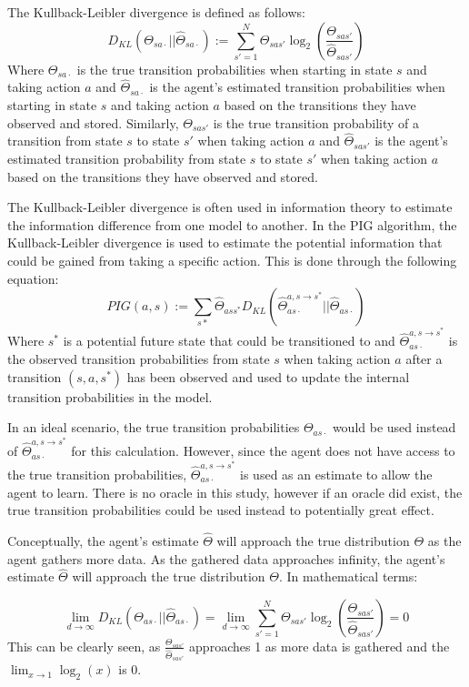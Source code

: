\documentclass[12pt]{thesis}
\begin{document}
The Kullback-Leibler divergence is defined as follows:
\[D_{KL} (\Theta_{sa\cdot} || \hat{\Theta}_{sa\cdot}) := \sum_{s' = 1}^{ N} \Theta_{sas'} \log_{2}(\frac{\Theta_{sas'}}{\hat{\Theta}_{sas'}})   \]
Where $\Theta_{sa\cdot}$ is the true transition probabilities when starting in state $s$ and taking action $a$ and $\hat{\Theta}_{sa\cdot}$ is the agent's estimated transition probabilities when starting in state $s$ and taking action $a$  based on the transitions they have observed and stored. Similarly, $\Theta_{sas'}$ is the true transition probability of a transition from state $s$ to state $s'$ when taking action $a$ and $\hat{\Theta}_{sas'}$ is the agent's estimated transition probability from state $s$ to state $s'$ when taking action $a$ based on the transitions they have observed and stored.

The Kullback-Leibler divergence is often used in information theory to estimate the information difference from one model to another. In the PIG algorithm, the Kullback-Leibler divergence is used to estimate the potential information that could be gained from taking a specific action.
This is done through the following equation:
\[ PIG(a,s) := \sum_{s*} \hat{\Theta}_{ass^{*}}D_{KL}(\hat{\Theta}_{as\cdot}^{a,s \rightarrow s^{*}} || \hat{\Theta}_{as\cdot}) \]
Where $s^{*}$ is a potential future state that could be transitioned to and $\hat{\Theta}_{as\cdot}^{a,s \rightarrow s^{*}}$ is the observed transition probabilities from state $s$ when taking action $a$ after a transition $(s,a,s^{*})$ has been observed and used to update the internal transition probabilities in the model.

In an ideal scenario, the true transition probabilities $\Theta_{as\cdot}$ would be used instead of $\hat{\Theta}_{as\cdot}^{a,s \rightarrow s^{*}}$ for this calculation. However, since the agent does not have access to the true transition probabilities, $\hat{\Theta}_{as\cdot}^{a,s \rightarrow s^{*}}$ is used as an estimate to allow the agent to learn. There is no oracle in this study, however if an oracle did exist, the true transition probabilities could be used instead to potentially great effect.

Conceptually, the agent's estimate $\hat{\Theta}$ will approach the true distribution $\Theta$ as the agent gathers more data. As the gathered data approaches infinity, the agent's estimate $\hat{\Theta}$ will approach the true distribution $\Theta$. In mathematical terms:

\[ \lim_{d \rightarrow \infty} D_{KL}( \Theta_{as\cdot} || \hat{\Theta}_{as\cdot}) = \lim_{d \rightarrow \infty} \sum_{s' = 1}^{ N} \Theta_{sas'} \log_{2}(\frac{\Theta_{sas'}}{\hat{\Theta}_{sas'}}) = 0\]
This can be clearly seen, as $\frac{\Theta_{sas'}}{\hat{\Theta}_{sas'}}$ approaches 1 as more data is gathered and the $\lim_{x \rightarrow 1} \log_{2}(x)$ is 0.
\end{document}
